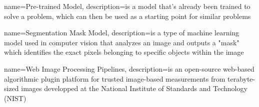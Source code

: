 {
    name=Pre-trained Model,
    description={is a model that's already been trained to solve a problem,
    which can then be used as a starting point for similar problems}
}

{
    name=Segmentation Mask Model,
    description={is a type of machine learning model used in computer vision
    that analyzes an image and outputs a "mask" which identifies the exact
    pixels belonging to specific objects within the image}
}

{
    name=Web Image Processing Pipelines,
    description={is an open-source web-based algorithmic plugin platform for
    trusted image-based measurements from terabyte-sized images developped at
    the National Institute of Standards and Technology (NIST)}
}

